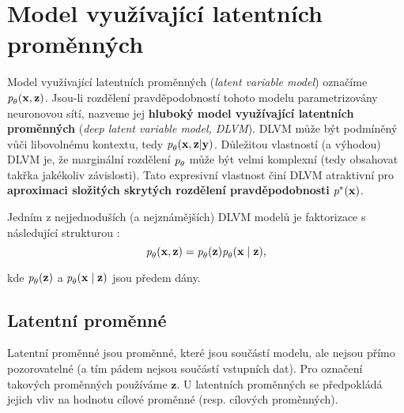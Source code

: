 \section{Model využívající latentních proměnných}
\label{sec:latent_variable_models}
Model využívající latentních proměnných (\emph{latent variable model}) označíme $\emph{p}_\theta(\mathbf{x}, \mathbf{z})$.
Jsou-li rozdělení pravděpodobností tohoto modelu parametrizovány neuronovou sítí,
nazveme jej \textbf{hluboký model využívající latentních proměnných} (\emph{deep latent variable model, DLVM}). DLVM může být podmíněný vůči libovolnému kontextu, tedy $\emph{p}_{\theta}(\mathbf{x}, \mathbf{z}|\mathbf{y})$.
Důležitou vlastností (a výhodou) DLVM je, že marginální rozdělení $\emph{p}_\theta$ může být velmi komplexní (tedy obsahovat takřka jakékoliv závislosti).
Tato expresivní vlastnost činí DLVM atraktivní pro \textbf{aproximaci složitých skrytých rozdělení pravděpodobnosti} $\emph{p}^*(\mathbf{x})$. \cite{Kingma2019}

Jedním z nejjednoduších (a nejznámějších) DLVM modelů je faktorizace s následující strukturou \cite{Kingma2019}:
\begin{equation}
    \emph{p}_\theta(\mathbf{x}, \mathbf{z}) = \emph{p}_\theta(\mathbf{z})\emph{p}_\theta(\mathbf{x}\mid\mathbf{z}),
\end{equation}

kde $\emph{p}_\theta(\mathbf{z})$ a $\emph{p}_\theta(\mathbf{x}\mid\mathbf{z})$ jsou předem dány.
\subsection{Latentní proměnné}
Latentní proměnné jsou proměnné, které jsou součástí modelu, ale nejsou přímo pozorovatelné (a tím pádem nejsou součástí vstupních dat).
Pro označení takových proměnných používáme $\mathbf{z}$. U latentních proměnných se předpokládá jejich vliv na hodnotu cílové proměnné (resp. cílových proměnných). \cite{Kingma2019}

